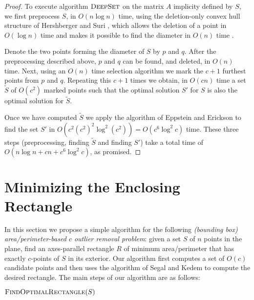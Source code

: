 \documentclass[lotsofwhite]{patmorin}
\begin{document}
\begin{proof}
To execute algorithm $\textsc{DeepSet}$ on the matrix $A$ implicity
defined by $S$, we first preprocess $S$, in $O(n\log n)$ time, using
the deletion-only convex hull structure of Hershberger and Suri
\cite{hs92}, which allows the deletion of a point in $O(\log n)$ time
and makes it possible to find the diameter in $O(n)$ time \cite{s78}.

Denote the two points forming the diameter of $S$ by $p$ and $q$.
After the preprocessing described above, $p$ and $q$ can be found, and
deleted, in $O(n)$ time.  Next, using an $O(n)$ time selection
algorithm we mark the $c+1$ furthest points from $p$ and $q$.
Repeating this $c+1$ times we obtain, in $O(cn)$ time a set
$\tilde{S}$ of $O(c^2)$ marked points such that the optimal solution
$S'$ for $S$ is also the optimal solution for $\tilde{S}$.

Once we have computed $\tilde{S}$ we apply the algorithm of Eppstein
and Erickson \cite{ee94} to find the set $S'$ in $O(c^2 (c^2)^2\log^2
(c^2)) = O(c^6\log^2 c)$ time.  These three steps (preprocessing,
finding $\tilde{S}$ and finding $S'$) take a total time of $O(n\log n
+ cn + c^6 \log^2 c)$, as promised.
\end{proof}

\section{Minimizing the Enclosing Rectangle}

In this section we propose a simple algorithm for the following
\emph{(bounding box) area/perimeter-based $c$ outlier removal problem}:
given a set $S$ of $n$ points in the plane, find an axes-parallel
rectangle $R$ of minimum area/perimeter that has exactly $c$-points of
$S$ in its exterior.  Our algorithm first computes a set of $O(c)$
candidate points and then uses the algorithm of Segal and Kedem
\cite{sk98} to compute the desired rectangle.  The main steps of our
algorithm are as follows:

\noindent
\begin{minipage}{\textwidth}
$\textsc{FindOptimalRectangle}(S)$
\begin{algorithmic}[1]
\end{algorithmic}
\end{minipage}
\end{document}
